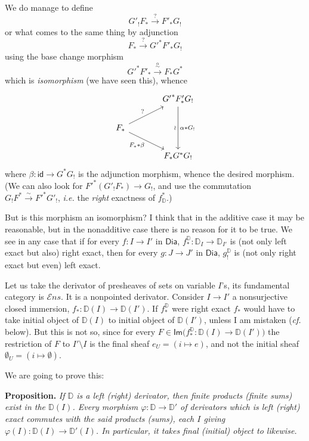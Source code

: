 \documentclass[11pt]{article}
\newcommand{\printedpage}[1]{\marginpar{\footnotesize p.~#1}}
\newcommand{\msp}[1]{\marginpar{\footnotesize [#1]}}
\newcommand{\D}{\mathbb{D}}
\newcommand{\Dia}{\mathsf{Dia}}
\newcommand{\id}{\mathsf{id}}
\newcommand{\Ens}{\mathcal{E}ns}
\newcommand{\sIm}{\mathsf{Im}}
\begin{document}
\printedpage{17}

We do manage to define
\[
G'_!F_* \xrightarrow{?} F'_*G_!
\]
or what comes to the same thing by adjunction
\[
F_* \xrightarrow{?} {G'}^*F'_*G_!
\]
using the base change morphism
\[
{G'}^*F'_* \xrightarrow{\overset{\alpha}{\sim}} F_*G^*
\]
which is \textit{isomorphism} (we have seen this), whence
\[
\begin{tikzcd}[column sep=large, row sep=normal]
& {G'}^*F'_*G_! \arrow[dd, "\wr"', "\alpha * G_!"] \\
F_* \arrow[ur, "?"] \arrow[dr, "F_* * \beta"'] & \\
& F_*G^*G_!
\end{tikzcd}
\]
where $\beta : \id \to G^*G_!$ is the adjunction morphism, whence the desired morphism. (We can also look for ${F'}^*(G'_!F_*) \to G_!$, and use the commutation $G_!F^* \overset{\sim}{\to} {F'}^*G'_!$, \textit{i.e.} the \textit{right} exactness of $f^*_{\D}$.)

\msp{page 25}

But is this morphism an isomorphism? I think that in the additive case it may be reasonable, but in the nonadditive case there is no reason for it to be true. We see in any case that if for every $f : I \to I'$ in $\Dia$, $f^{\D}_* : \D_I \to \D_{I'}$ is (not only left exact but also) right exact, then for every $g : J \to J'$ in $\Dia$, $g^{\D}_!$ is (not only right exact but even) left exact. %

Let us take the derivator of presheaves of sets on variable $I$'s, its fundamental category is $\Ens$. It is a nonpointed derivator. Consider $I \to I'$ a nonsurjective closed immersion, $f_* : \D(I) \to \D(I')$. If $f^{\D}_*$ were right exact $f_*$ would have to take initial object of $\D(I)$ to initial object of $\D(I')$, unless I am mistaken (\textit{cf.} below). But this is not so, since for every $F \in \sIm\bigl(f^{\D}_* : \D(I) \to \D(I')\bigr)$ the restriction of $F$ to $I' \setminus I$ is the final sheaf $e_U = (i \mapsto e)$, and not the initial sheaf $\emptyset_U = (i \mapsto \emptyset)$.

We are going to prove this:

\textbf{Proposition.} \textit{If $\D$ is a left (right) derivator, then finite products (finite sums) exist in the $\D(I)$. Every morphism $\varphi : \D \to \D'$ of derivators which is left (right) exact commutes with the said products (sums), each $I$ giving $\varphi(I) : \D(I) \to \D'(I)$. In particular, it takes final (initial) object to likewise.}
\end{document}
